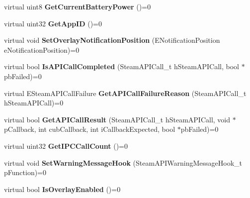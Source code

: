 \begin{DoxyCompactItemize}
\item 
\mbox{\label{class_i_steam_utils_a1cee42b53209deb6ab735f612ef01f0c}} 
virtual uint8 {\bfseries Get\+Current\+Battery\+Power} ()=0
\item 
\mbox{\label{class_i_steam_utils_a6ab494a421d0220b196ced7cd3e0fbba}} 
virtual uint32 {\bfseries Get\+App\+ID} ()=0
\item 
\mbox{\label{class_i_steam_utils_a1740a92ab814e9132ae06b5925408bd0}} 
virtual void {\bfseries Set\+Overlay\+Notification\+Position} (E\+Notification\+Position e\+Notification\+Position)=0
\item 
\mbox{\label{class_i_steam_utils_ab890ecbf78b1e84db17c51b5998680ca}} 
virtual bool {\bfseries Is\+A\+P\+I\+Call\+Completed} (Steam\+A\+P\+I\+Call\+\_\+t h\+Steam\+A\+P\+I\+Call, bool $\ast$pb\+Failed)=0
\item 
\mbox{\label{class_i_steam_utils_a40acce158f33543b3a0aa5d1deffcd21}} 
virtual E\+Steam\+A\+P\+I\+Call\+Failure {\bfseries Get\+A\+P\+I\+Call\+Failure\+Reason} (Steam\+A\+P\+I\+Call\+\_\+t h\+Steam\+A\+P\+I\+Call)=0
\item 
\mbox{\label{class_i_steam_utils_ab3449ee1977e394786075135f1d7617f}} 
virtual bool {\bfseries Get\+A\+P\+I\+Call\+Result} (Steam\+A\+P\+I\+Call\+\_\+t h\+Steam\+A\+P\+I\+Call, void $\ast$p\+Callback, int cub\+Callback, int i\+Callback\+Expected, bool $\ast$pb\+Failed)=0
\item 
\mbox{\label{class_i_steam_utils_a3fe65aaf04da204adc13e5c569875b1b}} 
virtual uint32 {\bfseries Get\+I\+P\+C\+Call\+Count} ()=0
\item 
\mbox{\label{class_i_steam_utils_ab78c11723eebfc4d8d931f4e4b2bb7d8}} 
virtual void {\bfseries Set\+Warning\+Message\+Hook} (Steam\+A\+P\+I\+Warning\+Message\+Hook\+\_\+t p\+Function)=0
\item 
\mbox{\label{class_i_steam_utils_a4daed74c0dcca45da507913a4577028c}} 
virtual bool {\bfseries Is\+Overlay\+Enabled} ()=0
\item 

\end{DoxyCompactItemize}
